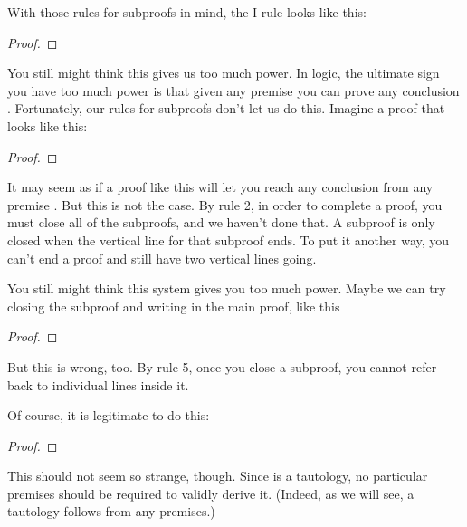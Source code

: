 With those rules for subproofs in mind, the {\eif}I rule looks like this:

\begin{proof}
	\open
		 
	\close
\end{proof}

You still might think this gives us too much power. In logic, the ultimate sign you have too much power is that given any premise  you can prove any conclusion . Fortunately, our rules for subproofs don't let us do this. Imagine a proof that looks like this:

\begin{proof}
	\open
\end{proof}

It may seem as if a proof like this will let you reach any conclusion  from any premise . But this is not the case. By rule 2, in order to complete a proof, you must close all of the subproofs, and we haven't done that. A subproof is only closed when the vertical line for that subproof ends. To put it another way, you  can't end a proof and still have two vertical lines going. 

You still might think this system gives you too much power. Maybe we can try closing the subproof and writing  in the main proof, like this 

\begin{proof}
	\open
		 
	\close
	 
\end{proof}

But this is wrong, too. By rule 5, once you close a subproof, you cannot refer back to individual lines inside it.

Of course, it is legitimate to do this:

\begin{proof}
	\open
		 
	\close
	 
\end{proof}

This should not seem so strange, though. Since \eif{} is a tautology, no particular premises should be required to validly derive it. (Indeed, as we will see, a tautology follows from any premises.)

